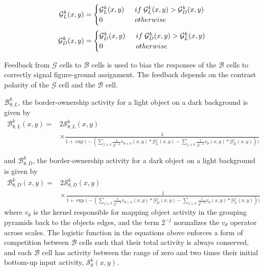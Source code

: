 \begin{equation}
	\mathcal{G}^k_{L}(x,y)=
	\begin{cases}
	\mathcal{G}^k_{L}(x,y) \:\;&if\;\mathcal{G}^k_{L}(x,y) > \mathcal{G}^k_{D}(x,y)\\
	0\;&otherwise
	\end{cases}\\
\end{equation}
\begin{equation}
	\mathcal{G}^k_{D}(x,y)=
	\begin{cases}
	\mathcal{G}^k_{D}(x,y) \:\;&if\;\mathcal{G}^k_{D}(x,y) > \mathcal{G}^k_{L}(x,y)\\
	0\;&otherwise
	\end{cases}\\
\end{equation}

%
Feedback from $\mathcal{G}$ cells to $\mathcal{B}$ cells is used to bias the responses of the $\mathcal{B}$ cells to correctly signal figure-ground assignment. The feedback depends on the contrast polarity of the $\mathcal{G}$ cell and the $\mathcal{B}$ cell.

 $\mathcal{B}^k_{\theta,L}$, the border-ownership activity for a light object on a dark background is given by
 \begin{equation}
 \begin{split}
\mathcal{B}^k_{\theta,L}(x,y) = &2\mathcal{S}^k_{\theta,L}(x,y)\\
            &\times\frac{1}{1+\exp\Big(-(\sum_{j\geq k}\frac{1}{2^{j-k}} v_{\theta+\pi}(x,y) \ast \mathcal{G}^j_{L}(x,y)-\sum_{j\geq k}\frac{1}{2^{j-k}} v_{\theta}(x,y) \ast \mathcal{G}^j_{D}(x,y))\Big)}
\end{split}
\label{eq:border-orientation1}
\end{equation}

and $\mathcal{B}^k_{\theta,D}$, the border-ownership activity for a dark object on a light background is given by
 \begin{equation}
 \begin{split}
\mathcal{B}^k_{\theta,D}(x,y) = &2\mathcal{S}^k_{\theta,D}(x,y)\\
            &\times\frac{1}{1+\exp\Big(-(\sum_{j\geq k}\frac{1}{2^{j-k}} v_{\theta+\pi}(x,y) \ast \mathcal{G}^j_{D}(x,y)-\sum_{j\geq k}\frac{1}{2^{j-k}} v_{\theta}(x,y) \ast \mathcal{G}^j_{L}(x,y))\Big)}
\end{split}
\label{eq:border-orientation2}
\end{equation}
where $v_{\theta}$ is the kernel responsible for mapping object activity in the grouping pyramids back to the objects edges, and the term $2^{-j}$ normalizes the $v_{\theta}$ operator across scales. The logistic function in the equations above enforces a form of competition between
$\mathcal{B}$
cells such that their total activity is always conserved, and each
$\mathcal{B}$
cell has activity between the range of zero and two times their initial bottom-up input activity, $\mathcal{S}^k_{\theta}(x,y)$.

